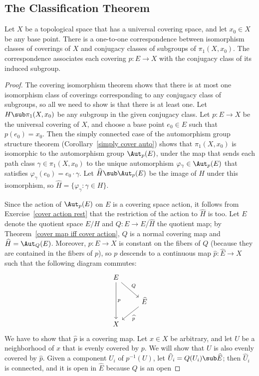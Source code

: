 \subsection{The Classification Theorem}
\begin{theorem}
Let $X$ be a topological space that has a universal covering space, and let $x_0\in X$ be any base point. There is a one-to-one correspondence between isomorphism classes of coverings of $X$ and conjugacy classes of subgroups of $\pi_1(X,x_0)$. The correspondence associates each covering $p:E\to X$ with the conjugacy class of its induced subgroup.
\end{theorem}
\begin{proof}
The covering isomorphism theorem shows that there is at most one isomorphism class of coverings corresponding to any conjugacy class of subgroups, so all we need to show is that there is at least one. Let $H\sub\pi_1(X,x_0)$ be any subgroup in the given conjugacy class. Let $p:E\to X$ be the universal covering of $X$, and choose a base point $e_0\in E$ such that $p(e_0)=x_0$. Then the simply connected case of the automorphism group structure theorem (Corollary~\ref{simply cover auto}) shows that $\pi_1(X,x_0)$ is isomorphic to the automorphism group $\Aut_p(E)$, under the map that sends each path class $\gamma\in\pi_1(X,x_0)$ to the unique automorphism $\varphi_\gamma\in\Aut_p(E)$ that satisfies $\varphi_\gamma(e_0)=e_0\cdot\gamma$. Let $\widehat{H}\sub\Aut_p(E)$ be the image of $H$ under this isomorphism, so $\widehat{H}=\{\varphi_\gamma:\gamma\in H\}$.\par
Since the action of $\Aut_p(E)$ on $E$ is a covering space action, it follows from Exercise~\ref{cover action rest} that the restriction of the action to $\widehat{H}$ is too. Let $E$ denote the quotient
space $E/\widehat{H}$ and $Q:E\to E/\widehat{H}$ the quotient map; by Theorem~\ref{cover map iff cover action}, $Q$ is a normal covering map and $\widehat{H}=\Aut_Q(E)$. Moreover, $p:E\to X$ is constant on the fibers of $Q$ (because they are contained in the fibers of $p$), so $p$ descends to a continuous map $\widehat{p}:\widehat{E}\to X$ such that the following diagram commutes:
\[\begin{tikzcd}
E\ar[dd,"p"]\ar[rd,"Q"]&\\
&\widehat{E}\ar[ld,"\widehat{p}"]\\
X
\end{tikzcd}\]
We have to show that $\widehat{p}$ is a covering map. Let $x\in X$ be arbitrary, and let $U$ be a neighborhood of $x$ that is evenly covered by $p$. We will show that $U$ is also evenly covered by $\widehat{p}$. Given a component $U_i$ of $p^{-1}(U)$, let $\widehat{U}_i=Q(U_i)\sub\widehat{E}$; then $\widehat{U}_i$ is connected, and it is open in $\widehat{E}$ because $Q$ is an open

\end{proof}
